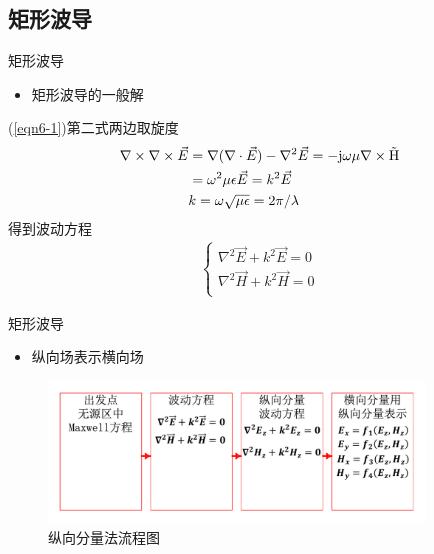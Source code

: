 \subsection{矩形波导}

\begin{frame}{矩形波导}
    \begin{itemize}
        \item 矩形波导的一般解
    \end{itemize}
    (\ref{eqn6-1})第二式两边取旋度
    \begin{align*}
        \nabla\times\nabla\times\vec{E} & =\nabla(\nabla\cdot\vec{E})-\nabla^2\vec{E}=-\rm{j}\omega\mu\nabla\times\vec{H} \\
                                        & =\omega^2\mu\epsilon\vec{E}=k^2\vec{E}                                          \\
                                        & k=\omega\sqrt{\mu\epsilon}=2\pi/\lambda
    \end{align*}
    得到波动方程
    \begin{align}
        \begin{cases}
            \nabla^2\vec{E}+k^2\vec{E}=0 \\
            \nabla^2\vec{H}+k^2\vec{H}=0 \\
        \end{cases}\label{eqn6-2}
    \end{align}
\end{frame}

\begin{frame}{矩形波导}
    \begin{itemize}
        \item 纵向场表示横向场
    \end{itemize}
    \centering
    \begin{figure}
        \includegraphics[width=10cm]{Cha6/fig6-2.pdf}
        \caption{纵向分量法流程图}   %
    \end{figure}
\end{frame}

